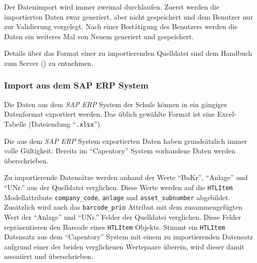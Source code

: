 Der Datenimport wird immer zweimal durchlaufen. Zuerst werden die
importierten Daten zwar generiert, aber nicht gespeichert und dem
Benutzer nur zur Validierung vorgelegt. Nach einer Bestätigung des
Benutzers werden die Daten ein weiteres Mal von Neuem generiert und
gespeichert.

Details über das Format einer zu importierenden Quelldatei sind dem
Handbuch zum Server () zu entnehmen.

\hypertarget{import-aus-dem-sap-erp-system}{%
\subsubsection{Import aus dem SAP ERP
System}\label{import-aus-dem-sap-erp-system}}

Die Daten aus dem \emph{SAP ERP}
System der Schule können in ein gängiges Datenformat exportiert werden.
Das üblich gewählte Format ist eine Excel-Tabelle (Dateiendung
``\texttt{.xlsx}'').

Die aus dem \emph{SAP ERP}
System exportierten Daten haben grundsätzlich immer volle Gültigkeit.
Bereits im ``Capentory'' System vorhandene Daten werden überschrieben.

Zu importierende Datensätze werden anhand der Werte ``BuKr'', ``Anlage''
und ``UNr.'' aus der Quelldatei verglichen. Diese Werte werden auf die
\texttt{HTLItem} Modellattribute \texttt{company\_code}, \texttt{anlage}
und \texttt{asset\_subnumber} abgebildet. Zusätzlich wird auch das
\texttt{barcode\_prio} Attribut mit dem zusammengefügten Wert der
``Anlage'' und ``UNr.'' Felder der Quelldatei verglichen. Diese Felder
repräsentieren den Barcode eines \texttt{HTLItem} Objekts. Stimmt ein
\texttt{HTLItem} Datensatz aus dem ``Capentory'' System mit einem zu
importierenden Datensatz aufgrund einer der beiden verglichenen
Wertepaare überein, wird dieser damit assoziiert und überschrieben.

